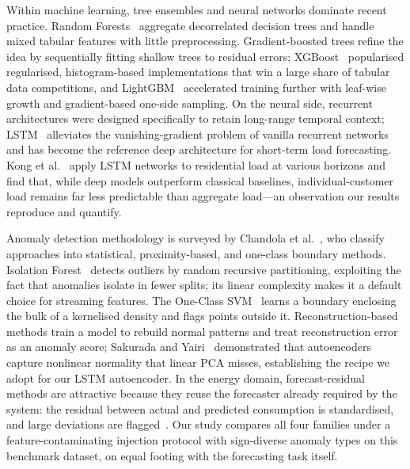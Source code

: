 \documentclass[10pt,a4paper]{article}
\begin{document}
Within machine learning, tree ensembles and neural networks dominate recent practice.
Random Forests~\cite{breiman2001random} aggregate decorrelated decision trees and
handle mixed tabular features with little preprocessing. Gradient-boosted trees
refine the idea by sequentially fitting shallow trees to residual errors;
XGBoost~\cite{chen2016xgboost} popularised regularised, histogram-based implementations
that win a large share of tabular data competitions, and
LightGBM~\cite{ke2017lightgbm} accelerated training further with leaf-wise growth and
gradient-based one-side sampling. On the neural side, recurrent architectures were
designed specifically to retain long-range temporal context;
LSTM~\cite{hochreiter1997lstm} alleviates the vanishing-gradient problem of vanilla
recurrent networks and has become the reference deep architecture for
short-term load forecasting. Kong et al.~\cite{kong2019lstm} apply LSTM networks to
residential load at various horizons and find that, while deep models outperform
classical baselines, individual-customer load remains far less predictable than
aggregate load---an observation our results reproduce and quantify.

Anomaly detection methodology is surveyed by Chandola et
al.~\cite{chandola2009anomaly}, who classify approaches into statistical,
proximity-based, and one-class boundary methods. Isolation
Forest~\cite{liu2008isolation} detects outliers by random recursive partitioning,
exploiting the fact that anomalies isolate in fewer splits; its linear complexity
makes it a default choice for streaming features. The One-Class
SVM~\cite{scholkopf2001ocsvm} learns a boundary enclosing the bulk of a kernelised
density and flags points outside it. Reconstruction-based methods train a model to
rebuild normal patterns and treat reconstruction error as an anomaly score; Sakurada
and Yairi~\cite{sakurada2014autoencoder} demonstrated that autoencoders capture
nonlinear normality that linear PCA misses, establishing the recipe we adopt for our
LSTM autoencoder. In the energy domain, forecast-residual methods are attractive
because they reuse the forecaster already required by the system: the residual between
actual and predicted consumption is standardised, and large deviations are
flagged~\cite{hyndman2021fpp}. Our study compares all four families under a
feature-contaminating injection protocol with sign-diverse anomaly types on this
benchmark dataset, on equal footing with the forecasting task itself.

\end{document}
